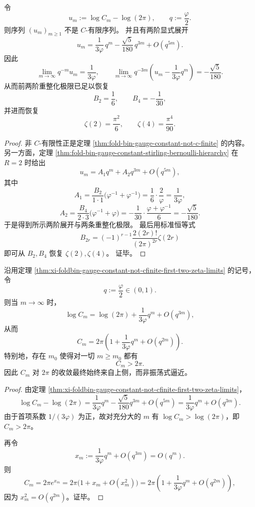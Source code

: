 \begin{theorem}\label{thm:xi-foldbin-gauge-constant-not-cfinite-first-two-zeta-limits}
令
\[
u_m:=\log C_m-\log(2\pi),
\qquad
q:=\frac{\varphi}{2}.
\]
则序列 \((u_m)_{m\ge 1}\) 不是 \(C\)-有限序列。
并且有两阶显式展开
\[
u_m
=
\frac{1}{3\varphi}\,q^m
-\frac{\sqrt5}{180}\,q^{3m}
+O(q^{5m}).
\]
因此
\[
\lim_{m\to\infty}q^{-m}u_m=\frac{1}{3\varphi},
\qquad
\lim_{m\to\infty}q^{-3m}\left(u_m-\frac{1}{3\varphi}q^m\right)
=
-\frac{\sqrt5}{180}.
\]
从而前两阶重整化极限已足以恢复
\[
B_2=\frac16,\qquad B_4=-\frac1{30},
\]
并进而恢复
\[
\zeta(2)=\frac{\pi^2}{6},
\qquad
\zeta(4)=\frac{\pi^4}{90}.
\]
\end{theorem}
\begin{proof}
非 \(C\)-有限性正是定理 \ref{thm:fold-bin-gauge-constant-not-c-finite} 的内容。
另一方面，定理 \ref{thm:fold-bin-gauge-constant-stirling-bernoulli-hierarchy} 在 \(R=2\) 时给出
\[
u_m
=
A_1q^m+A_2q^{3m}+O(q^{5m}),
\]
其中
\[
A_1=
\frac{B_2}{1\cdot 1}\bigl(\varphi^{-1}+\varphi^{-1}\bigr)
=
\frac16\cdot\frac{2}{\varphi}
=
\frac{1}{3\varphi},
\]
\[
A_2=
\frac{B_4}{2\cdot 3}\bigl(\varphi^{-1}+\varphi\bigr)
=
-\frac{1}{30}\cdot\frac{\varphi+\varphi^{-1}}{6}
=
-\frac{\sqrt5}{180}.
\]
于是得到所示两阶展开与两条重整化极限。
最后用标准恒等式
\[
B_{2r}=(-1)^{r-1}\frac{2(2r)!}{(2\pi)^{2r}}\zeta(2r)
\]
即可从 \(B_2,B_4\) 恢复 \(\zeta(2),\zeta(4)\)。
证毕。
\end{proof}

\begin{theorem}\label{thm:xi-foldbin-gauge-constant-one-sided-approach-2pi}
沿用定理 \ref{thm:xi-foldbin-gauge-constant-not-cfinite-first-two-zeta-limits} 的记号，令
\[
q:=\frac{\varphi}{2}\in(0,1).
\]
则当 \(m\to\infty\) 时，
\[
\log C_m
=
\log(2\pi)+\frac{1}{3\varphi}q^m+O(q^{3m}),
\]
从而
\[
C_m
=
2\pi\left(1+\frac{1}{3\varphi}q^m+O(q^{2m})\right).
\]
特别地，存在 \(m_0\) 使得对一切 \(m\ge m_0\) 都有
\[
C_m>2\pi.
\]
因此 \(C_m\) 对 \(2\pi\) 的收敛最终始终来自上侧，而非振荡式逼近。
\end{theorem}
\begin{proof}
由定理 \ref{thm:xi-foldbin-gauge-constant-not-cfinite-first-two-zeta-limits}，
\[
\log C_m-\log(2\pi)
=
\frac{1}{3\varphi}q^m-\frac{\sqrt5}{180}q^{3m}+O(q^{5m})
=
\frac{1}{3\varphi}q^m+O(q^{3m}).
\]
由于首项系数 \(1/(3\varphi)\) 为正，故对充分大的 \(m\) 有 \(\log C_m>\log(2\pi)\)，即 \(C_m>2\pi\)。

再令
\[
x_m:=\frac{1}{3\varphi}q^m+O(q^{3m})=O(q^m).
\]
则
\[
C_m=2\pi e^{x_m}
=
2\pi\bigl(1+x_m+O(x_m^2)\bigr)
=
2\pi\left(1+\frac{1}{3\varphi}q^m+O(q^{2m})\right),
\]
因为 \(x_m^2=O(q^{2m})\)。证毕。
\end{proof}

